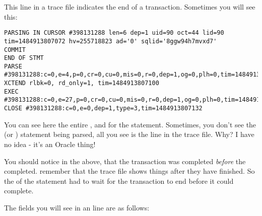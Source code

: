 This line in a trace file indicates the end of a transaction. Sometimes you will see this:

\begin{lstlisting}[numbers=none,caption={Commit Statement with Xctend Line}]
PARSING IN CURSOR #398131288 len=6 dep=1 uid=90 oct=44 lid=90 tim=1484913807072 hv=255718823 ad='0' sqlid='8ggw94h7mvxd7'
COMMIT
END OF STMT
PARSE #398131288:c=0,e=4,p=0,cr=0,cu=0,mis=0,r=0,dep=1,og=0,plh=0,tim=1484913807071
XCTEND rlbk=0, rd_only=1, tim=1484913807100
EXEC #398131288:c=0,e=27,p=0,cr=0,cu=0,mis=0,r=0,dep=1,og=0,plh=0,tim=1484913807121
CLOSE #398131288:c=0,e=0,dep=1,type=3,tim=1484913807132
\end{lstlisting}

You can see here the entire ,  and  for the statement. Sometimes, you don't see the  (or ) statement being parsed, all you see is the  line in the trace file. Why? I have no idea - it's an Oracle thing!

You should notice in the above, that the transaction was completed \emph{before} the  completed. remember that the trace file shows things after they have finished. So the  of the  statement had to wait for the transaction to end before it could complete.

The fields you will see in an  line are as follows:

